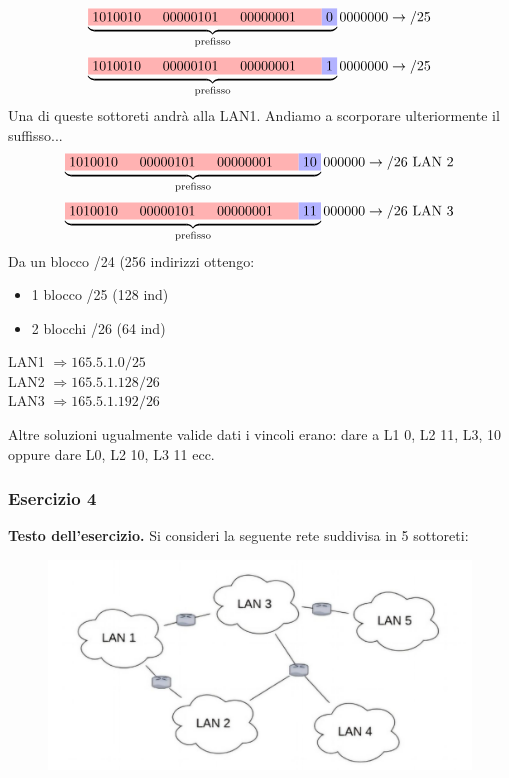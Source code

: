 \documentclass[12pt]{article}
\begin{document}
\[\underbrace{\colorbox{red!30!white}{1010010 \; \; 00000101 \; \; 00000001 \; \; }\colorbox{blue!30!white}{0}}_{\text{prefisso}}0000000 \rightarrow /25\]
\[\underbrace{\colorbox{red!30!white}{1010010 \; \; 00000101 \; \; 00000001 \; \; }\colorbox{blue!30!white}{1}}_{\text{prefisso}}0000000 \rightarrow /25\]
Una di queste sottoreti andrà alla LAN1. Andiamo a scorporare ulteriormente il suffisso...
\[\underbrace{\colorbox{red!30!white}{1010010 \; \; 00000101 \; \; 00000001 \; \; }\colorbox{blue!30!white}{10}}_{\text{prefisso}}000000 \rightarrow /26 \text{ LAN 2}\]
\[\underbrace{\colorbox{red!30!white}{1010010 \; \; 00000101 \; \; 00000001 \; \; }\colorbox{blue!30!white}{11}}_{\text{prefisso}}000000 \rightarrow /26 \text{ LAN 3}\]
Da un blocco /24 (256 indirizzi ottengo:
\begin{itemize}
    \item 1 blocco /25 (128 ind)
    \item 2 blocchi /26 (64 ind)
\end{itemize}
\begin{center}
    LAN1 $\Longrightarrow 165.5.1.0/25$\\
    LAN2 $\Longrightarrow 165.5.1.128/26$\\
    LAN3 $\Longrightarrow 165.5.1.192/26$\\
\end{center}
Altre soluzioni ugualmente valide dati i vincoli erano: dare a L1 0, L2 11, L3, 10 oppure dare L0, L2 10, L3 11 ecc.
\subsubsection{Esercizio 4}

\textbf{Testo dell'esercizio.} Si consideri la seguente rete suddivisa in 5 sottoreti:

\begin{figure}[H]
    \centering
    \includegraphics[width=1\textwidth]{Esercizio1.png}
    \label{fig:centered-image}
\end{figure}
\end{document}
